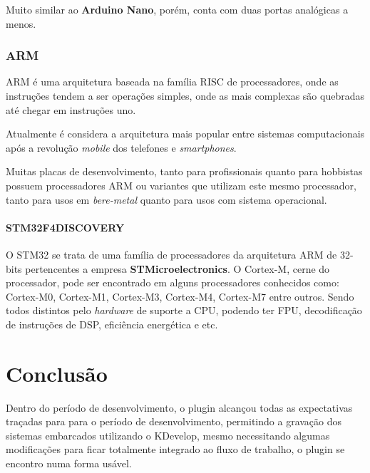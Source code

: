 Muito similar ao \textbf{Arduino Nano}, porém, conta com duas portas analógicas a menos.


\subsection{ARM}

ARM é uma arquitetura baseada na família RISC de processadores, onde as instruções tendem a ser operações simples, onde as mais complexas são quebradas até chegar em instruções uno.

Atualmente é considera a arquitetura mais popular entre sistemas computacionais após a revolução \textit{mobile} dos telefones e \textit{smartphones}.

Muitas placas de desenvolvimento, tanto para profissionais quanto para hobbistas possuem processadores ARM ou variantes que utilizam este mesmo processador, tanto para usos em \textit{bere-metal} quanto para usos com sistema operacional.


\subsubsection{STM32F4DISCOVERY}

O STM32 se trata de uma família de processadores da arquitetura ARM de 32-bits pertencentes a empresa \textbf{STMicroelectronics}. O Cortex-M, cerne do processador, pode ser encontrado em alguns processadores conhecidos como: Cortex-M0, Cortex-M1, Cortex-M3, Cortex-M4, Cortex-M7 entre outros. Sendo todos distintos pelo \textit{hardware} de suporte a CPU, podendo ter FPU, decodificação de instruções de DSP, eficiência energética e etc.



\chapter{Conclusão}
Dentro do período de desenvolvimento, o plugin alcançou todas as expectativas traçadas para para o período de desenvolvimento,
permitindo a gravação dos sistemas embarcados utilizando o KDevelop, mesmo necessitando algumas modificações para ficar
totalmente integrado ao fluxo de trabalho, o plugin se encontro numa forma usável.

